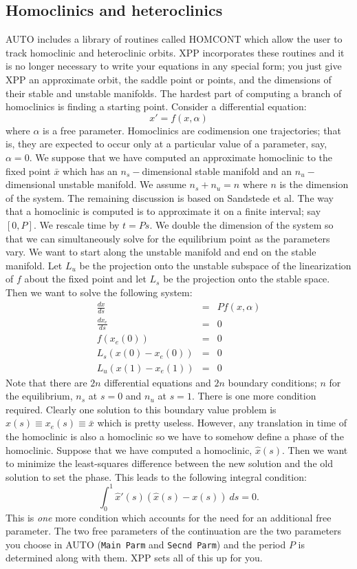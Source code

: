 \documentclass{article}
\begin{document}
\subsection{Homoclinics and heteroclinics}  AUTO
includes a library of routines called HOMCONT which allow the user to
track homoclinic and heteroclinic orbits.  XPP incorporates these routines and it
is no longer necessary to write your equations in any special form;
you just give XPP an approximate orbit, the saddle point or points, and the
dimensions of their stable and unstable manifolds.  The hardest part of computing a branch of
homoclinics is finding a starting point.  Consider a differential
equation:
\[
 x'=f(x,\alpha)
\]
where $\alpha$ is a free parameter. Homoclinics are codimension one
trajectories; that is, they are expected to occur only at a particular
value of a parameter, say, $\alpha=0.$  We suppose that we have
computed an approximate homoclinic to the fixed point $\bar{x}$ which
has an $n_s-$dimensional stable manifold and an $n_u-$dimensional
unstable manifold. We assume $n_s+n_u=n$ where $n$ is the dimension of
the system. The remaining discussion is based on Sandstede et al.
The way that a homoclinic is computed is to
approximate it on a finite interval; say $[0,P].$ We rescale time by
$t=Ps.$ We double the dimension of the system so that we can
simultaneously solve for the equilibrium point as the parameters vary.
We want to start along the unstable manifold and end on the stable
manifold. Let $L_u$ be the projection onto the unstable subspace of
the linearization of $f$ about the fixed point and let $L_s$ be the
projection onto the stable space.  Then we want to solve the following
system:
\begin{eqnarray*}
\frac{dx}{ds} &=& P f(x,\alpha) \\
\frac{dx_e}{ds}&=& 0 \\
f(x_e(0)) &=& 0 \\
L_s (x(0)-x_e(0)) &=& 0 \\
L_u (x(1)-x_e(1)) &=& 0
\end{eqnarray*}
Note that there are $2n$ differential equations and $2n$ boundary
conditions; $n$ for the equilibrium, $n_s$ at $s=0$ and $n_u$ at
$s=1.$  There is one more condition required.  Clearly one solution to
this boundary value problem is $x(s)\equiv x_e(s)\equiv \bar{x}$ which
is pretty useless.  However, any translation in time of the homoclinic
is also a homoclinic so we have to somehow define a phase of the
homoclinic.  Suppose that we have computed a homoclinic, $\hat{x}(s).$
Then we want to minimize the least-squares difference between the new
solution and the old solution to set the phase. This leads to the
following integral condition:
\[
 \int_0^1 \hat{x}'(s)(\hat{x}(s)-x(s))\ ds = 0.
\]
This is {\em one} more condition which accounts for the need for an
additional free parameter.  The two free parameters of the continuation
are the two parameters you choose in AUTO ({\tt Main Parm} and {\tt Secnd Parm}) and
the period $P$ is determined along with them.  XPP sets all of this up for you.
\end{document}
